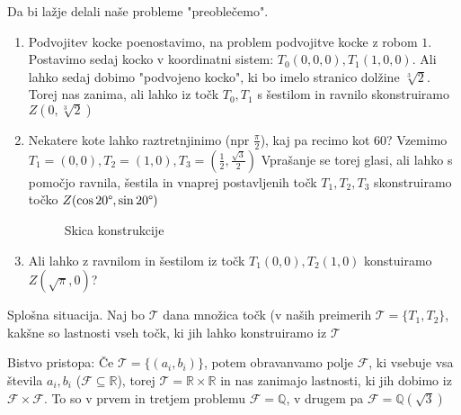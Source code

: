 \documentclass[a4paper]{article}
\begin{document}
Da bi lažje delali naše probleme "preoblečemo". 
\begin{enumerate}
\item Podvojitev kocke poenostavimo, na problem podvojitve kocke z robom $1$. Postavimo sedaj kocko v koordinatni sistem: $T_0(0,0,0), T_1(1,0,0)$. Ali lahko sedaj dobimo "podvojeno kocko", ki bo imelo stranico dolžine $\sqrt[3]{2}$. Torej nas zanima, ali lahko iz točk $T_0, T_1$ s šestilom in ravnilo skonstruiramo $Z(0, \sqrt[3]{2})$

\item Nekatere kote lahko raztretnjinimo (npr $\frac{\pi}{2}$), kaj pa recimo kot $60$\textdegree ? Vzemimo $T_1 = (0,0), T_2 = (1,0), T_3 = (\frac{1}{2}, \frac{\sqrt{3}}{2})$ Vprašanje se torej glasi, ali lahko s pomočjo ravnila, šestila in vnaprej postavljenih točk $T_1, T_2, T_3$ skonstruiramo točko $Z(\cos 20\text{\textdegree}, \sin 20\text{\textdegree})$

\begin{figure}[h]
\centering
{}
\caption{Skica konstrukcije}
\end{figure}

\item Ali lahko z ravnilom in šestilom iz točk $T_1(0,0), T_2(1,0)$ konstuiramo $Z(\sqrt{\pi}, 0)$?

\end{enumerate}

Splošna situacija. Naj bo $\mathcal{T}$ dana množica točk (v naših preimerih $\mathcal{T} = \{T_1, T_2\}$, kakšne so lastnosti vseh točk, ki jih lahko konstruiramo iz $\mathcal{T}$

Bistvo pristopa: Če $\mathcal{T} = \{ (a_i, b_i) \}$, potem obravanvamo polje $\mathcal{F}$, ki vsebuje vsa števila $a_i, b_i$ ($\mathcal{F} \subseteq \mathbb{R}$), torej $\mathcal{T} = \mathbb{R} \times \mathbb{R}$ in nas zanimajo lastnosti, ki jih dobimo iz $\mathcal{F} \times \mathcal{F}$. To so v prvem in tretjem problemu $\mathcal{F} = \mathbb{Q}$, v drugem pa $\mathcal{F} = \mathbb{Q}(\sqrt{3})$
\end{document}
